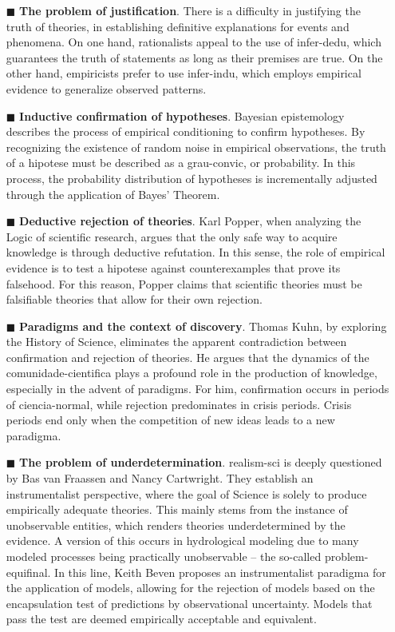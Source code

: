\documentclass[./main_en.tex]{subfiles}
\begin{document}
\begin{itemize}
    \item[$\blacksquare$] \textbf{The problem of justification}. There is a difficulty in justifying the truth of theories, in establishing definitive explanations for events and phenomena. On one hand, rationalists appeal to the use of \gls{infer-dedu}, which guarantees the truth of statements as long as their premises are true. On the other hand, empiricists prefer to use \gls{infer-indu}, which employs empirical evidence to generalize observed patterns.
    \item[$\blacksquare$] \textbf{Inductive confirmation of hypotheses}. Bayesian epistemology describes the process of empirical \gls{conditioning} to confirm hypotheses. By recognizing the existence of random noise in empirical observations, the truth of a \gls{hipotese} must be described as a \gls{grau-convic}, or probability. In this process, the probability distribution of hypotheses is incrementally adjusted through the application of Bayes' Theorem.
    \item[$\blacksquare$] \textbf{Deductive rejection of theories}. Karl Popper, when analyzing the Logic of scientific research, argues that the only safe way to acquire knowledge is through deductive refutation. In this sense, the role of empirical evidence is to test a \gls{hipotese} against counterexamples that prove its falsehood. For this reason, Popper claims that scientific theories must be falsifiable theories that allow for their own rejection.
    \item[$\blacksquare$] \textbf{Paradigms and the context of discovery}. Thomas Kuhn, by exploring the History of Science, eliminates the apparent contradiction between confirmation and rejection of theories. He argues that the dynamics of the \gls{comunidade-cientifica} plays a profound role in the production of knowledge, especially in the advent of paradigms. For him, confirmation occurs in periods of \gls{ciencia-normal}, while rejection predominates in crisis periods. Crisis periods end only when the competition of new ideas leads to a new \gls{paradigma}.
    \item[$\blacksquare$] \textbf{The problem of underdetermination}. \gls{realism-sci} is deeply questioned by Bas van Fraassen and Nancy Cartwright. They establish an instrumentalist perspective, where the goal of Science is solely to produce empirically adequate theories. This mainly stems from the instance of unobservable entities, which renders theories underdetermined by the evidence. A version of this occurs in hydrological modeling due to many modeled processes being practically unobservable -- the so-called \gls{problem-equifinal}. In this line, Keith Beven proposes an instrumentalist \gls{paradigma} for the application of models, allowing for the rejection of models based on the encapsulation test of predictions by observational uncertainty. Models that pass the test are deemed empirically acceptable and equivalent.
\end{itemize}
\end{document}
